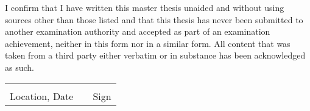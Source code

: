 I confirm that I have written this master thesis unaided and without using sources other than those listed and that this thesis has never been submitted to another examination authority and accepted as part of an examination achievement, neither in this form nor in a similar form. All content that was taken from a third party either verbatim or in substance has been acknowledged as such.
\vskip 0.5cm

\begin{table}[!htb]
\centering
\begin{tabularx}{\textwidth}{lXl}

       \hspace{6cm} &  & \hspace{6cm} \\
\cline{1-1}\cline{3-3}
Location, Date  &  & Sign
\end{tabularx}
\end{table}